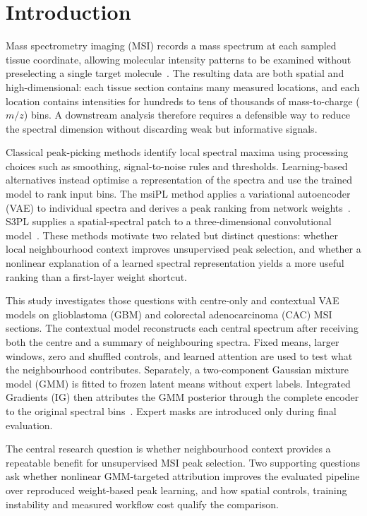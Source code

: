 \section{Introduction}
\label{sec:introduction}

Mass spectrometry imaging (MSI) records a mass spectrum at each sampled tissue
coordinate, allowing molecular intensity patterns to be examined without
preselecting a single target molecule~\citep{caprioli1997maldi,schwamborn2010molecular}.
The resulting data are both spatial and high-dimensional: each tissue section
contains many measured locations, and each location contains intensities for
hundreds to tens of thousands of mass-to-charge ($m/z$) bins. A downstream
analysis therefore requires a defensible way to reduce the spectral dimension
without discarding weak but informative signals.

Classical peak-picking methods identify local spectral maxima using processing
choices such as smoothing, signal-to-noise rules and thresholds. Learning-based
alternatives instead optimise a representation of the spectra and use the
trained model to rank input bins. The msiPL method applies a variational
autoencoder (VAE) to individual spectra and derives a peak ranking from network
weights~\citep{abdelmoula2021peak}. S3PL supplies a spatial-spectral patch to a
three-dimensional convolutional model~\citep{weigand2026spatial}. These methods
motivate two related but distinct questions: whether local neighbourhood
context improves unsupervised peak selection, and whether a nonlinear
explanation of a learned spectral representation yields a more useful ranking
than a first-layer weight shortcut.

This study investigates those questions with centre-only and contextual VAE
models on glioblastoma (GBM) and colorectal adenocarcinoma (CAC) MSI sections.
The contextual model reconstructs each central spectrum after receiving both
the centre and a summary of neighbouring spectra. Fixed means, larger windows,
zero and shuffled controls, and learned attention are used to test what the
neighbourhood contributes. Separately, a two-component Gaussian mixture model
(GMM) is fitted to frozen latent means without expert labels. Integrated
Gradients (IG) then attributes the GMM posterior through the complete encoder
to the original spectral bins~\citep{sundararajan2017axiomatic}. Expert masks
are introduced only during final evaluation.

The central research question is whether neighbourhood context provides a
repeatable benefit for unsupervised MSI peak selection. Two supporting
questions ask whether nonlinear GMM-targeted attribution improves the evaluated
pipeline over reproduced weight-based peak learning, and how spatial controls,
training instability and measured workflow cost qualify the comparison.

